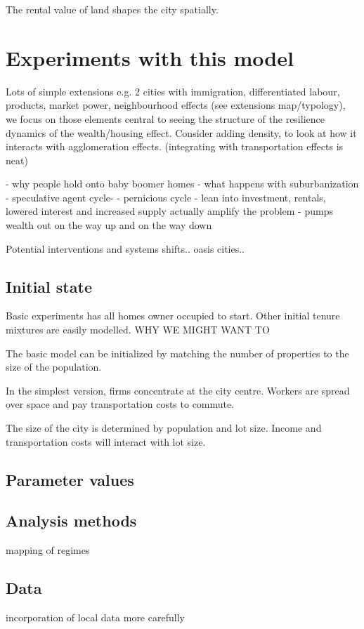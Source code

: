 The rental value of land shapes the city spatially.  

\section{Experiments with this model}
Lots of simple extensions e.g. 2 cities with immigration, differentiated labour, products, market power, neighbourhood effects (see extensions map/typology), we focus on those elements central to seeing the structure of the resilience dynamics of the wealth/housing effect. Consider adding density, to look at how it interacts with agglomeration effects. (integrating with transportation effects is neat)


- why people hold onto baby boomer homes
- what happens with suburbanization
- speculative agent cycle- 
- pernicious cycle - lean into investment, rentals, lowered interest and increased supply actually amplify the problem
- pumps wealth out on the way up and on the way down


Potential interventions and systems shifts.. oasis cities..





\subsection{Initial state}
Basic experiments has all homes owner occupied to start. Other initial tenure mixtures are easily modelled. WHY WE MIGHT WANT TO

The basic model can be initialized by matching the number of properties to the size of the population. 

In the simplest version, firms concentrate at the city centre. Workers are spread over space and pay transportation costs to commute.

The size of the city is determined by population and lot size. Income and transportation costs will interact with lot size. 

\subsection{Parameter values}

\subsection{Analysis methods}
mapping of regimes

\subsection{Data}
incorporation of local data more carefully

